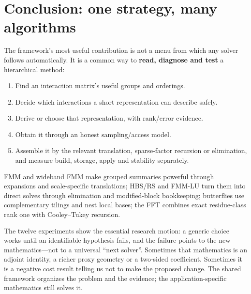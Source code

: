 \section{Conclusion: one strategy, many algorithms}
The framework's most useful contribution is not a menu from which any solver follows automatically. It is a common way to \textbf{read, diagnose and test} a hierarchical method:
\begin{enumerate}
 \item Find an interaction matrix's useful groups and orderings.
 \item Decide which interactions a short representation can describe safely.
 \item Derive or choose that representation, with rank/error evidence.
 \item Obtain it through an honest sampling/access model.
 \item Assemble it by the relevant translation, sparse-factor recursion or elimination, and measure build, storage, apply and stability separately.
\end{enumerate}
FMM and wideband FMM make grouped summaries powerful through expansions and scale-specific translations; HBS/RS and FMM-LU turn them into direct solves through elimination and modified-block bookkeeping; butterflies use complementary tilings and nest local bases; the FFT combines exact residue-class rank one with Cooley--Tukey recursion.

The twelve experiments show the essential research motion: a generic choice works until an identifiable hypothesis fails, and the failure points to the new mathematics---not to a universal ``next solver''. Sometimes that mathematics is an adjoint identity, a richer proxy geometry or a two-sided coefficient. Sometimes it is a negative cost result telling us not to make the proposed change. The shared framework organizes the problem and the evidence; the application-specific mathematics still solves it.

